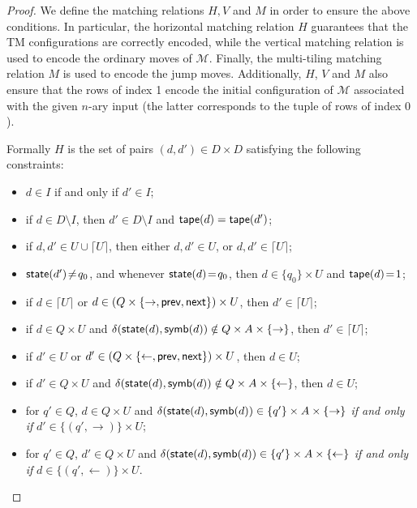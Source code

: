 \begin{proof}
 We define the matching relations $H,V$ and $M$ in order to ensure the above conditions. In particular,  the horizontal matching relation
 $H$   guarantees that the TM configurations are correctly encoded, while the vertical matching relation is used to
 encode the ordinary moves of $\mathcal{M}$. Finally, the multi-tiling matching relation $M$ is used to encode the jump moves. Additionally, $H$, $V$ and $M$ also ensure that
 the rows of index 1 encode the initial configuration of $\mathcal{M}$ associated with the given $n$-ary input (the latter corresponds to the tuple of rows of index $0$).

 Formally $H$ is the set of pairs $(d,d')\!\in\! D\!\times\! D$ satisfying the following constraints:
\begin{itemize}
\item $d\in I$ if and only if   $d'\in I$;
\item if $d\in D\setminus I$, then $d'\in D\setminus I$ and $\text{{\sffamily tape}}(d)=\text{{\sffamily tape}}(d')$;
\item if $d,d'\in U\cup \lceil U \rceil$, then either $d,d'\in U$, or $d,d'\in \lceil U \rceil$;
\item $\text{{\sffamily state}}(d')\!\neq\! q_0$, and whenever $\text{{\sffamily state}}(d)\!=\!q_0$, then $d\!\in\!\{q_0\}\!\times\! U$ and $\text{{\sffamily tape}}(d)\!=\!1$;
\item if   $d\in \lceil U \rceil$ or $d\in (Q\times \{\rightarrow,\text{{\sffamily prev}},\text{{\sffamily next}}\})\times U$, then $d'\in \lceil U \rceil$;
\item if $d\in Q\times U$ and $\delta(\text{{\sffamily state}}(d),\text{{\sffamily symb}}(d))\notin Q\times A \times \{\rightarrow\}$, then $d'\in \lceil U \rceil$;
\item if  $d'\in U$ or $d'\in (Q\times \{\leftarrow,\text{{\sffamily prev}},\text{{\sffamily next}}\})\times U$, then $d\in U$;
\item if $d'\in Q\times U$ and $\delta(\text{{\sffamily state}}(d),\text{{\sffamily symb}}(d))\notin Q\times A \times \{\leftarrow\}$, then $d\in U$;
\item for $q'\in Q$,  $d\in Q\times U$ and $\delta(\text{{\sffamily state}}(d),\text{{\sffamily symb}}(d))\in \{q'\}\times A\times \{\rightarrow\}$ \emph{if and only if}  $d'\in \{(q',\rightarrow)\}\times U$;
\item for $q'\in Q$, $d'\in Q\times U$ and $\delta(\text{{\sffamily state}}(d),\text{{\sffamily symb}}(d))\in \{q'\}\times A\times \{\leftarrow\}$ \emph{if and only if} $d\in \{(q',\leftarrow)\}\times U$.
\end{itemize}


\end{proof}
